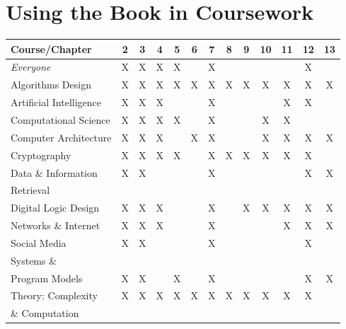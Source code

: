 \documentclass{article}
\begin{document}
\section*{Using the Book in Coursework}

\bigskip

\begin{tabular}{|l||c|c|c|c|c|c|c|c|c|c|c|c|}
\hline
{\bf Course}/{\bf Chapter}
   & 2 & 3 & 4 & 5 & 6 & 7 & 8 & 9 & 10 & 11 & 12 & 13 \\
\hline
\hline
{\em Everyone} 
   & X & X & X & X &  & X &  &  &  &  & X &  \\
\hline
Algorithms Design
   & X & X & X & X & X & X & X & X & X & X & X & X \\
\hline
Artificial Intelligence
   & X & X & X &  &  & X &  &  &  & X & X &  \\
   \hline
Computational Science
   & X & X & X & X &  & X &  &  & X & X &  &  \\
\hline
Computer Architecture 
   & X & X &  X&  & X & X &  &  & X & X & X & X \\
\hline
Cryptography 
   & X & X & X & X &  & X & X & X & X & X & X &  \\
\hline
Data \& Information 
   & X & X &  &  &  & X &  &  &  &  & X & X \\
Retrieval
    &  &  &  &  &  &  &  &  &  &  &  & \\
\hline
Digital Logic Design 
   & X & X & X &  &  & X &  & X & X & X & X & X \\
\hline
Networks \& Internet
   & X & X & X &  &  & X &  &  &  & X & X & X \\
\hline
Social Media 
   & X & X &  &  &  & X &  &  &  &  & X &  \\
\hline
Systems \&    &  &  &  &  &  &  &  &  &  &  &  & \\
Program Models 
   & X & X &  & X &  & X &  &  &  &  & X & X \\
\hline
Theory: Complexity 
   & X & X & X & X & X & X & X & X & X & X & X &  \\
\& Computation    &  &  &  &  &  &  &  &  &  &  &  & \\
\hline
\end{tabular}
\bigskip
\end{document}
